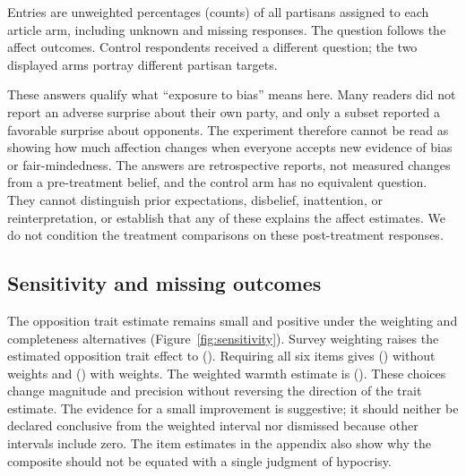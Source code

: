\documentclass[11pt]{article}
\begin{document}
\begin{table}[!htbp]
\centering\small
\caption{YouGov: reported bias relative to prior expectations.}
\label{tab:bias}
\begin{minipage}{\linewidth}\footnotesize
Entries are unweighted percentages (counts) of all partisans assigned to each article arm, including unknown and missing responses. The question follows the affect outcomes. Control respondents received a different question; the two displayed arms portray different partisan targets.
\end{minipage}
\end{table}

These answers qualify what ``exposure to bias'' means here. Many readers did not report an adverse surprise about their own party, and only a subset reported a favorable surprise about opponents. The experiment therefore cannot be read as showing how much affection changes when everyone accepts new evidence of bias or fair-mindedness. The answers are retrospective reports, not measured changes from a pre-treatment belief, and the control arm has no equivalent question. They cannot distinguish prior expectations, disbelief, inattention, or reinterpretation, or establish that any of these explains the affect estimates. We do not condition the treatment comparisons on these post-treatment responses.

\subsection{Sensitivity and missing outcomes}
The opposition trait estimate remains small and positive under the weighting and completeness alternatives (Figure~\ref{fig:sensitivity}). Survey weighting raises the estimated opposition trait effect to \YgWeightedTraitEstimate{} (\YgWeightedTraitCI{}). Requiring all six items gives \YgCompleteTraitEstimate{} (\YgCompleteTraitCI{}) without weights and \YgCompleteWeightedEstimate{} (\YgCompleteWeightedCI{}) with weights. The weighted warmth estimate is \YgWeightedFtEstimate{} (\YgWeightedFtCI{}). These choices change magnitude and precision without reversing the direction of the trait estimate. The evidence for a small improvement is suggestive; it should neither be declared conclusive from the weighted interval nor dismissed because other intervals include zero. The item estimates in the appendix also show why the composite should not be equated with a single judgment of hypocrisy.
\end{document}
